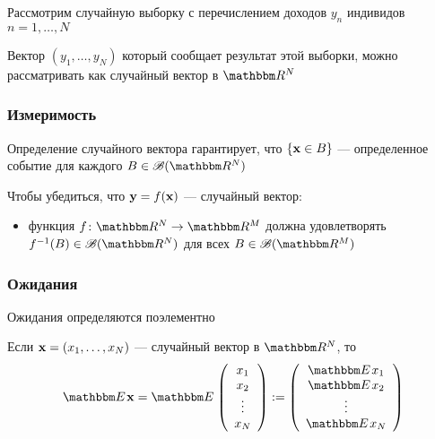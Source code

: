 \begin{frame}

    \vspace{2em}
    \Eg
    Рассмотрим случайную выборку с перечислением доходов $y_n$ индивидов $n=1,\ldots,N$
    
    Вектор $(y_1, \ldots, y_N)$ который сообщает результат этой выборки, можно 
    рассматривать как случайный вектор в $\RR^N$
    
\end{frame}

\begin{frame}\frametitle{Измеримость} 

     \vspace{2em}
    Определение случайного вектора гарантирует, что $\{{\mathbf x} \in B\}$ ---
    определенное событие для каждого $B \in \bB(\RR^N)$
    
    \vspace{1em}
    Чтобы убедиться, что ${\mathbf y} = f({\mathbf x})$ --- случайный вектор:
    
    \begin{itemize}
        \item функция $f \colon \RR^N \to \RR^M$ должна удовлетворять 
        $f^{-1}(B) \in \bB(\RR^N)$ для всех $B \in \bB(\RR^M)$
    \end{itemize}

\end{frame}

\begin{frame}\frametitle{Ожидания}

    \vspace{2em}
    Ожидания определяются поэлементно
    
    \vspace{1em}
    Если ${\mathbf x} = (x_1, \ldots, x_N)$ --- случайный вектор 
    в $\RR^N$, то 
    \begin{equation*}
        \EE \boldx
        = 
        \EE
        \left(
        \begin{array}{c}
            x_1 \\
            x_2 \\
            \vdots \\
            x_N
        \end{array}
        \right)
        :=
        \left(
        \begin{array}{c}
            \EE x_1 \\
            \EE x_2 \\
            \vdots \\
            \EE x_N
        \end{array}
        \right)
    \end{equation*}

\end{frame}

